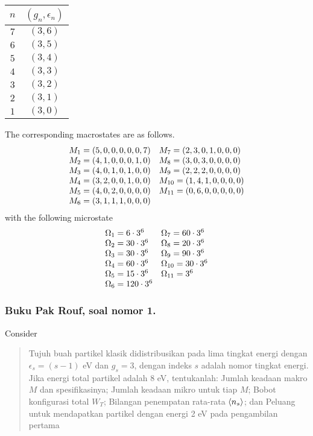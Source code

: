 \documentclass[../../../Main.tex]{subfiles}
\begin{document}
\begin{table}[h]
    \centering
    \begin{tabular}{cc}
        \toprule
        $n$ & $(g_n,\epsilon_n)$\\ 
        \midrule
        $7$&$(3,6)$\\
        $6$&$(3,5)$\\
        $5$&$(3,4)$\\ 
        $4$&$(3,3)$\\
        $3$&$(3,2)$\\
        $2$&$(3,1)$\\
        $1$&$(3,0)$\\
        \bottomrule
    \end{tabular}
\end{table}
The corresponding macrostates are as follows.
\begin{equation*}
    \begin{array}{l l}
        M_1=(5,0,0,0,0,0,7)& M_7=(2,3,0,1,0,0,0)\\
        M_2=(4,1,0,0,0,1,0)& M_8=(3,0,3,0,0,0,0)\\
        M_3=(4,0,1,0,1,0,0)& M_9=(2,2,2,0,0,0,0)\\
        M_4=(3,2,0,0,1,0,0)& M_{10}=(1,4,1,0,0,0,0)\\
        M_5=(4,0,2,0,0,0,0)&M_{11}=(0,6,0,0,0,0,0)\\
        M_6=(3,1,1,1,0,0,0)&
    \end{array}
\end{equation*}
with the following microstate
\begin{equation*}
    \begin{array}{l l}
        \Omega_1=6\cdot3^6& \Omega_7=60\cdot3^6\\
        \Omega_2=30\cdot3^6& \Omega_8=20\cdot3^6\\
        \Omega_3=30\cdot3^6& \Omega_9=90\cdot3^6\\
        \Omega_4=60\cdot3^6& \Omega_{10}=30\cdot3^6\\
        \Omega_5=15\cdot3^6&\Omega_{11}=3^6\\
        \Omega_6=120\cdot3^6&
    \end{array}
\end{equation*}

\subsubsection{Buku Pak Rouf, soal nomor 1.} Consider 
\begin{quotation}
    Tujuh buah partikel klasik didistribusikan pada lima tingkat energi dengan $\epsilon_s = (s-1) $ eV dan $g_s =3$, dengan indeks $s$ adalah nomor tingkat energi. Jika energi total partikel adalah 8 eV, tentukanlah: Jumlah keadaan makro $M$ dan spesifikasinya; Jumlah keadaan mikro untuk tiap $M$; Bobot konfigurasi total $W_T$; Bilangan penempatan rata-rata $\braket{n_s}$; dan Peluang untuk mendapatkan partikel dengan energi 2 eV pada pengambilan pertama
\end{quotation}
\end{document}
